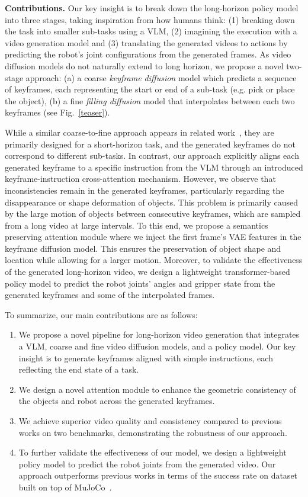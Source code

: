\documentclass[letterpaper, 10 pt, conference]{ieeeconf}  %
\begin{document}
\textbf{Contributions.} Our key insight is to break down the long-horizon policy model into three stages, taking inspiration from how humans think: (1) breaking down the task into smaller sub-tasks using a VLM, (2) imagining the execution with a video generation model and (3) translating the generated videos to actions by predicting the robot's joint configurations from the generated frames. As video diffusion models do not naturally extend to long horizon, we propose a novel two-stage approach: (a) a coarse \textit{keyframe diffusion}  model which predicts a sequence of keyframes, each representing the start or end of a sub-task (e.g. pick or place the object), (b) a fine \textit{filling diffusion } model that interpolates between each two keyframes (see Fig.~\ref{teaser}).  

While a similar coarse-to-fine approach appears in related work~\cite{unipi}, they are primarily designed for a short-horizon task, and the generated keyframes do not correspond to different sub-tasks. In contrast, our approach explicitly aligns each generated keyframe to a specific instruction from the VLM through an introduced keyframe-instruction cross-attention mechanism. However, we observe that inconsistencies remain in the generated keyframes, particularly regarding the disappearance or shape deformation of objects. This problem is primarily caused by the large motion of objects between consecutive keyframes, which are sampled from a long video at large intervals. To this end, we propose a semantics preserving attention module where we inject the first frame's VAE features in the keyframe diffusion model. This ensures the preservation of object shape and location while allowing for a larger motion. Moreover, to validate the effectiveness of the generated long-horizon video, we design a lightweight transformer-based policy model to predict the robot joints' angles and gripper state from the generated keyframes and some of the interpolated frames. 

To summarize, our main contributions are as follows:
\begin{enumerate}[topsep=0pt]
    \item We propose a novel pipeline for long-horizon video generation that integrates a VLM, coarse and fine video diffusion models, and a policy model. Our key insight is to generate keyframes aligned with simple instructions, each reflecting the end state of a task. 
    \item We design a novel attention module to enhance the geometric consistency of the objects and robot across the generated keyframes.
    \item We achieve superior video quality and consistency compared to previous works on two benchmarks, demonstrating the robustness of our approach. 
    \item To further validate the effectiveness of our model, we design a lightweight policy model to predict the robot joints from the generated video. Our approach outperforms previous works in terms of the success rate on dataset built on top of MuJoCo~\cite{mujoco}. 
\end{enumerate}
\end{document}
